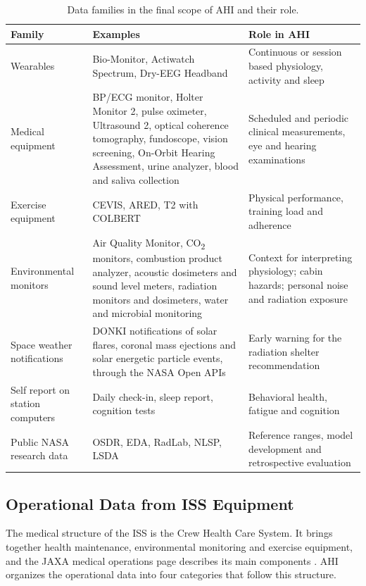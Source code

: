 \begin{table}[htbp]
\centering
\vspace{0.8em}
\caption{Data families in the final scope of AHI and their role.}
\label{tab:data-sources}
\small
\begin{tabular}{p{3.4cm}p{5.2cm}p{5.4cm}}
\hline
\textbf{Family} & \textbf{Examples} & \textbf{Role in AHI} \\
\hline
Wearables & Bio-Monitor, Actiwatch Spectrum, Dry-EEG Headband & Continuous or session based physiology, activity and sleep \\
Medical equipment & BP/ECG monitor, Holter Monitor 2, pulse oximeter, Ultrasound 2, optical coherence tomography, fundoscope, vision screening, On-Orbit Hearing Assessment, urine analyzer, blood and saliva collection & Scheduled and periodic clinical measurements, eye and hearing examinations \\
Exercise equipment & CEVIS, ARED, T2 with COLBERT & Physical performance, training load and adherence \\
Environmental monitors & Air Quality Monitor, CO\textsubscript{2} monitors, combustion product analyzer, acoustic dosimeters and sound level meters, radiation monitors and dosimeters, water and microbial monitoring & Context for interpreting physiology; cabin hazards; personal noise and radiation exposure \\
Space weather notifications & DONKI notifications of solar flares, coronal mass ejections and solar energetic particle events, through the NASA Open APIs & Early warning for the radiation shelter recommendation \\
Self report on station computers & Daily check-in, sleep report, cognition tests & Behavioral health, fatigue and cognition \\
Public NASA research data & OSDR, EDA, RadLab, NLSP, LSDA & Reference ranges, model development and retrospective evaluation \\
\hline
\end{tabular}
\vspace{1.2em}
\end{table}

\subsection{Operational Data from ISS Equipment}
\label{subsec:operational-data}

The medical structure of the ISS is the Crew Health Care System. It brings together health maintenance, environmental monitoring and exercise equipment, and the JAXA medical operations page describes its main components \cite{jaxa_medops_system}. AHI organizes the operational data into four categories that follow this structure.

